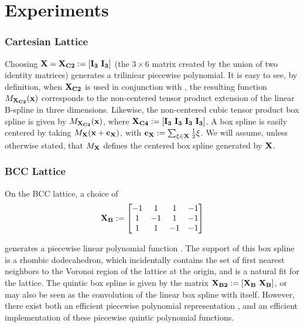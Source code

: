 \section{Experiments}

\subsubsection{Cartesian Lattice}
Choosing $\mathbf{\mathbf{X} = \mathbf{X}_{C2} := \left[ I_3  \ I_3 \right]}$ (the $3 \times 6$ matrix created by the union of two identity matrices) generates a triliniear piecewise polynomial. It is easy to see, by definition, when $\mathbf{\mathbf{X}_{C2}}$ is used in conjunction with , the resulting function $M_\mathbf{\mathbf{X}_{C2}}(\mathbf{x})$ corresponds to the non-centered tensor product extension of the linear B-spline in three dimensions. Likewise, the non-centered cubic tensor product box spline is given by $M_\mathbf{\mathbf{X}_{C4}}(\mathbf{x})$, where $\mathbf{\mathbf{X}_{C4} := \left[ I_3  \ I_3 \ I_3  \ I_3 \right]}$. A box spline is easily centered by taking $M_\mathbf{\mathbf{X}}(\mathbf{x} + \mathbf{c_{\mathbf{X}}})$, with $\mathbf{c_{\mathbf{X}}}:=\sum_{\xi \in \mathbf{\mathbf{X}}} \frac{1}{2}\xi$. We will assume, unless otherwise stated, that $M_\mathbf{\mathbf{X}}$ defines the centered box spline generated by $\mathbf{\mathbf{X}}$.

\subsubsection{BCC Lattice}
On the BCC lattice, a choice of {\footnotesize
\begin{equation*}
	\mathbf{\mathbf{X}_{B}} := 
	\begin{bmatrix} 
		-1 & 1 & 1 & -1 \\
		1 & -1 & 1 & -1 \\
		1 & 1 & -1 & -1 
	\end{bmatrix}
\end{equation*}}

generates a piecewise linear polynomial function \cite{practicalbox}. The support of this box spline is a rhombic dodecahedron, which incidentally contains the set of first nearest neighbors to the Voronoi region of the lattice at the origin, and is a natural fit for the lattice. The quintic box spline is given by the matrix $\mathbf{\mathbf{X}_{B2}} := \left[\mathbf{\mathbf{X}_{B}} \ \mathbf{\mathbf{X}_{B}}\right]$, or may also be seen as the convolution of the linear box spline with itself.  However, there exist both an efficient piecewise polynomial representation \cite{practicalbox}, and an efficient implementation \cite{fastbox} of these piecewise quintic polynomial functions.

